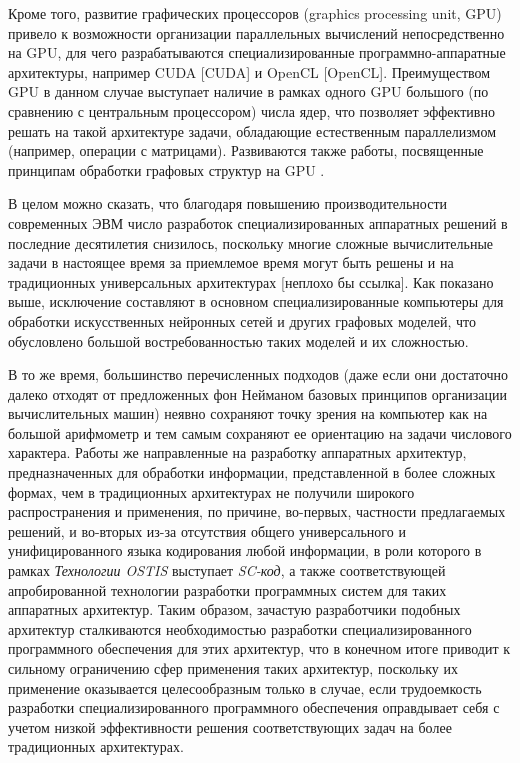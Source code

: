 Кроме того, развитие графических процессоров (graphics processing unit, GPU) привело к возможности организации параллельных вычислений непосредственно на GPU, для чего разрабатываются специализированные программно-аппаратные архитектуры, например CUDA [CUDA] и OpenCL [OpenCL]. Преимуществом GPU в данном случае выступает наличие в рамках одного GPU большого (по сравнению с центральным процессором) числа ядер, что позволяет эффективно решать на такой архитектуре задачи, обладающие естественным параллелизмом (например, операции с  матрицами). Развиваются также работы, посвященные принципам обработки графовых структур на GPU \cite{Tran2018,Shi2018,Lu2021}. 

В целом можно сказать, что благодаря повышению производительности современных ЭВМ число разработок специализированных аппаратных решений в последние десятилетия снизилось, поскольку многие сложные вычислительные задачи в настоящее время за приемлемое время могут быть решены и на традиционных универсальных архитектурах [неплохо бы ссылка]. Как показано выше, исключение составляют в основном специализированные компьютеры для обработки искусственных нейронных сетей и других графовых моделей, что обусловлено большой востребованностью таких моделей и их сложностью.

В то же время, большинство перечисленных подходов (даже если они достаточно далеко отходят от предложенных фон Нейманом базовых принципов организации вычислительных машин) неявно сохраняют точку зрения на компьютер как на большой арифмометр и тем самым сохраняют ее ориентацию на задачи числового характера. Работы же направленные на разработку аппаратных архитектур, предназначенных для обработки информации, представленной в более сложных формах, чем в традиционных архитектурах не получили широкого распространения и применения, 
по причине, во-первых, частности предлагаемых решений, и во-вторых из-за отсутствия общего универсального и унифицированного языка кодирования любой информации, в роли которого в рамках \textit{Технологии OSTIS} выступает \textit{SC-код}, а также соответствующей апробированной технологии разработки программных систем для таких аппаратных архитектур. Таким образом, зачастую разработчики подобных архитектур сталкиваются необходимостью разработки специализированного программного обеспечения для этих архитектур, что в конечном итоге приводит к сильному ограничению сфер применения таких архитектур, поскольку их применение оказывается целесообразным только в случае, если трудоемкость разработки специализированного программного обеспечения оправдывает себя с учетом низкой эффективности решения соответствующих задач на более традиционных архитектурах.

